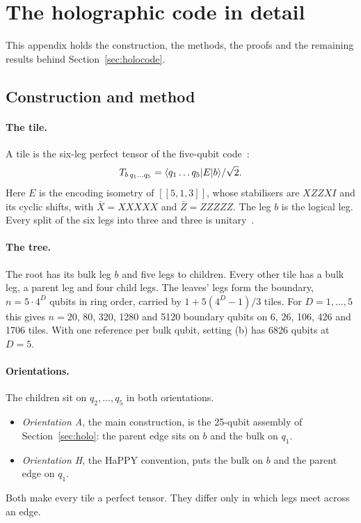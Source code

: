 \section{The holographic code in detail}\label{app:holocode}

This appendix holds the construction, the methods, the proofs and the remaining results behind Section~\ref{sec:holocode}.

\subsection{Construction and method}\label{sec:holocode-model}

\paragraph{The tile.} A tile is the six-leg perfect tensor of the five-qubit code~\cite{laflamme,bennett1996}:
\[
T_{b\,q_1\dots q_5}=\langle q_1\dots q_5\rvert E\lvert b\rangle/\sqrt2 .
\]
Here $E$ is the encoding isometry of $[[5,1,3]]$, whose stabilisers are $XZZXI$ and its cyclic shifts, with $\bar X=XXXXX$ and
$\bar Z=ZZZZZ$. The leg $b$ is the logical leg. Every split of the six legs into three and three is unitary~\cite{happy}.

\paragraph{The tree.} The root has its bulk leg $b$ and five legs to children. Every other tile has a bulk leg, a parent leg and four
child legs. The leaves' legs form the boundary, $n=5\cdot4^D$ qubits in ring order, carried by $1+5(4^{D}-1)/3$ tiles. For
$D=1,\dots,5$ this gives $n=20$, 80, 320, 1280 and 5120 boundary qubits on 6, 26, 106, 426 and 1706 tiles. With one reference per
bulk qubit, setting (b) has 6826 qubits at $D=5$.

\paragraph{Orientations.} The children sit on $q_2,\dots,q_5$ in both orientations.
\begin{itemize}[nosep]
\item \emph{Orientation A}, the main construction, is the 25-qubit assembly of Section~\ref{sec:holo}: the parent edge sits on $b$ and
  the bulk on $q_1$.
\item \emph{Orientation H}, the HaPPY convention, puts the bulk on $b$ and the parent edge on $q_1$.
\end{itemize}
Both make every tile a perfect tensor. They differ only in which legs meet across an edge.

